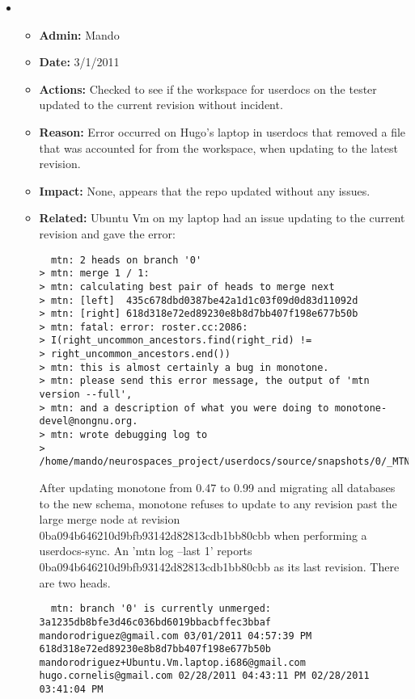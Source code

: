 \documentclass[12pt]{article}
\begin{document}
\begin{itemize}


\item
  \begin{itemize}
  \item[] {\bf Admin:} Mando
  \item[] {\bf Date:} 3/1/2011 
  \item[] {\bf Actions:} Checked to see if the workspace for userdocs on the tester updated to the current revision without incident.
  \item[] {\bf Reason:} Error occurred on Hugo's laptop in userdocs that removed a file that was accounted for from the workspace, when
  updating to the latest revision. 
  \item[] {\bf Impact:} None, appears that the repo updated without any issues. 
  \item[] {\bf Related:} Ubuntu Vm on my laptop had an issue updating to the current revision and gave the error:
  
  \begin{verbatim}
  mtn: 2 heads on branch '0'
> mtn: merge 1 / 1:
> mtn: calculating best pair of heads to merge next
> mtn: [left]  435c678dbd0387be42a1d1c03f09d0d83d11092d
> mtn: [right] 618d318e72ed89230e8b8d7bb407f198e677b50b
> mtn: fatal: error: roster.cc:2086:
> I(right_uncommon_ancestors.find(right_rid) !=
> right_uncommon_ancestors.end())
> mtn: this is almost certainly a bug in monotone.
> mtn: please send this error message, the output of 'mtn version --full',
> mtn: and a description of what you were doing to monotone-devel@nongnu.org.
> mtn: wrote debugging log to
> /home/mando/neurospaces_project/userdocs/source/snapshots/0/_MTN/debug
  \end{verbatim}
  
   After updating monotone from 0.47 to 0.99 and migrating all databases to the new schema, monotone refuses to update to any revision past 
   the large merge node at revision 0ba094b646210d9bfb93142d82813cdb1bb80cbb when performing a userdocs-sync. An 'mtn log --last 1' reports 0ba094b646210d9bfb93142d82813cdb1bb80cbb as its last revision. There are two heads.
   
  \begin{verbatim}
  mtn: branch '0' is currently unmerged:
3a1235db8bfe3d46c036bd6019bbacbffec3bbaf mandorodriguez@gmail.com 03/01/2011 04:57:39 PM
618d318e72ed89230e8b8d7bb407f198e677b50b mandorodriguez+Ubuntu.Vm.laptop.i686@gmail.com hugo.cornelis@gmail.com 02/28/2011 04:43:11 PM 02/28/2011 03:41:04 PM
  \end{verbatim}
  

\end{itemize}
\end{itemize}
\end{document}
